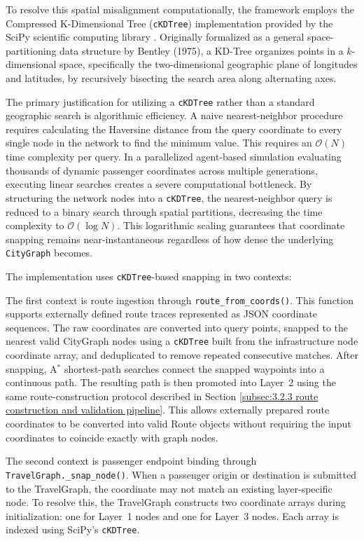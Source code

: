 {To resolve this spatial misalignment computationally, the framework employs the Compressed K-Dimensional Tree (\texttt{cKDTree}) implementation provided by the SciPy scientific computing library \citep{virtanen2020scipy}. Originally formalized as a general space-partitioning data structure by Bentley (1975), a KD-Tree organizes points in a $k$-dimensional space, specifically the two-dimensional geographic plane of longitudes and latitudes, by recursively bisecting the search area along alternating axes. 

The primary justification for utilizing a \texttt{cKDTree} rather than a standard geographic search is algorithmic efficiency. A naive nearest-neighbor procedure requires calculating the Haversine distance from the query coordinate to every single node in the network to find the minimum value. This requires an $\mathcal{O}(N)$ time complexity per query. In a parallelized agent-based simulation evaluating thousands of dynamic passenger coordinates across multiple generations, executing linear searches creates a severe computational bottleneck. By structuring the network nodes into a \texttt{cKDTree}, the nearest-neighbor query is reduced to a binary search through spatial partitions, decreasing the time complexity to $\mathcal{O}(\log N)$. This logarithmic scaling guarantees that coordinate snapping remains near-instantaneous regardless of how dense the underlying \texttt{CityGraph} becomes.

The implementation uses \texttt{cKDTree}-based snapping in two contexts:

The first context is route ingestion through \texttt{route\_from\_coords()}. This function supports externally defined route traces represented as \ac{JSON} coordinate sequences. The raw coordinates are converted into query points, snapped to the nearest valid CityGraph nodes using a \texttt{cKDTree} built from the infrastructure node coordinate array, and deduplicated to remove repeated consecutive matches. After snapping, A$^\ast$ shortest-path searches connect the snapped waypoints into a continuous path. The resulting path is then promoted into Layer~2 using the same route-construction protocol described in Section \ref{subsec:3.2.3 route construction and validation pipeline}. This allows externally prepared route coordinates to be converted into valid Route objects without requiring the input coordinates to coincide exactly with graph nodes.

The second context is passenger endpoint binding through \texttt{TravelGraph.\_snap\_node()}. When a passenger origin or destination is submitted to the TravelGraph, the coordinate may not match an existing layer-specific node. To resolve this, the TravelGraph constructs two coordinate arrays during initialization: one for Layer~1 nodes and one for Layer~3 nodes. Each array is indexed using SciPy's \texttt{cKDTree}.

}
